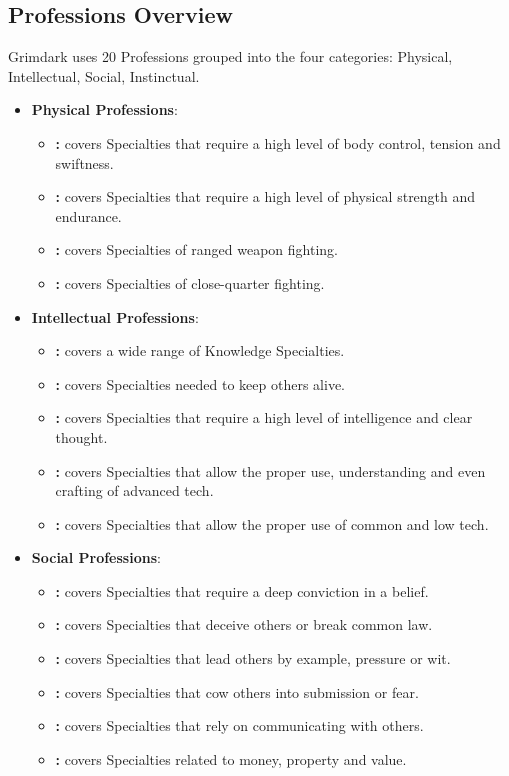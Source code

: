 \subsection{Professions Overview} \label{profession_overview_grouped}
Grimdark uses 20 Professions grouped into the four categories: Physical, Intellectual, Social, Instinctual.
\begin{itemize}
	\item \textbf{Physical Professions}:
	\begin{itemize}
		\item \textbf{:} covers Specialties that require a high level of body control, tension and swiftness.
		\item \textbf{:} covers Specialties that require a high level of physical strength and endurance.
		\item \textbf{:} covers Specialties of ranged weapon fighting.
		\item \textbf{:} covers Specialties of close-quarter fighting.
	\end{itemize}

	\item \textbf{Intellectual Professions}:
	\begin{itemize}
		\item \textbf{:} covers a wide range of Knowledge Specialties.
		\item \textbf{:} covers Specialties needed to keep others alive.
		\item \textbf{:} covers Specialties that require a high level of intelligence and clear thought.
		\item \textbf{:} covers Specialties that allow the proper use, understanding and even crafting of advanced tech.
		\item \textbf{:} covers Specialties that allow the proper use of common and low tech.		
	\end{itemize}

	\item \textbf{Social Professions}:
	\begin{itemize}
		\item \textbf{:} covers Specialties that require a deep conviction in a belief.
		\item \textbf{:} covers Specialties that deceive others or break common law.
		\item \textbf{:} covers Specialties that lead others by example, pressure or wit.
		\item \textbf{:} covers Specialties that cow others into submission or fear.
		\item \textbf{:} covers Specialties that rely on communicating with others.
		\item \textbf{:} covers Specialties related to money, property and value.
	\end{itemize}


\end{itemize}
